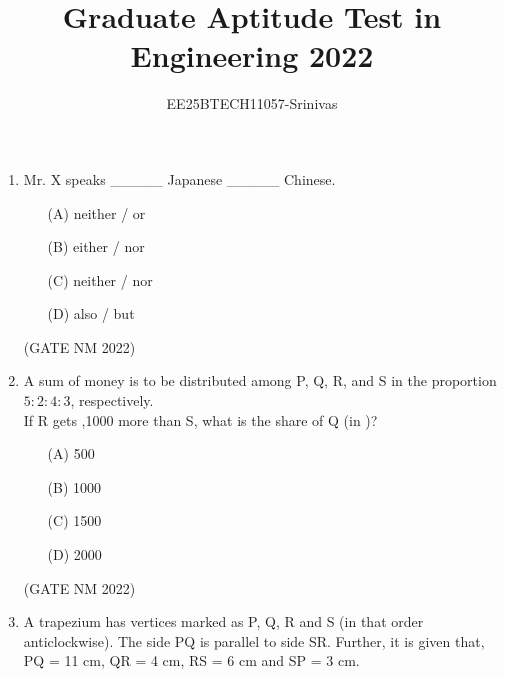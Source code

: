 \documentclass[journal,12pt,onecolumn]{IEEEtran}
\title{Graduate Aptitude Test in Engineering 2022}
\author{EE25BTECH11057-Srinivas}
\theoremstyle{remark}
\begin{document}
{\maketitle}




\begin{enumerate}
	\item  Mr. X speaks \_\_\_\_\_   Japanese \_\_\_\_\_  Chinese.\\[8pt]


\begin {enumerate}

\item [(A)] neither / or \\
\item [(B)] either / nor \\
\item [(C)] neither / nor \\
\item [(D)] also / but \\

\end{enumerate}

\hfill(GATE NM 2022) \\





\item  A sum of money is to be distributed among P, Q, R, and S in the proportion $5 : 2 : 4 : 3$, respectively.\\[6pt]
If R gets \rupee,1000 more than S, what is the share of Q (in \rupee)?\\[8pt]


\begin{enumerate}

	\item[(A)] 500 \\
	\item[(B)] 1000 \\
	\item[(C)] 1500 \\
	\item[(D)] 2000 \\

\end{enumerate}

\hfill(GATE NM 2022)





\item  A trapezium has vertices marked as P, Q, R and S (in that order anticlockwise).  
The side PQ is parallel to side SR. Further, it is given that,  
PQ = 11 cm, QR = 4 cm, RS = 6 cm and SP = 3 cm.  


\end{enumerate}
\end{document}
